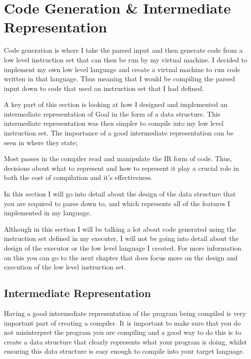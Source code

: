 
\chapter{Code Generation \& Intermediate Representation}

Code generation is where I take the parsed input and then generate code from a low level instruction set that can then be run by my virtual machine. I decided to implement my own low level language and create a virtual machine to run code written in that language. Thus meaning that I would be compiling the parsed input down to code that used an instruction set that I had defined.

A key part of this section is looking at how I designed and implemented an intermediate representation of Goal in the form of a data structure. This intermediate representation was then simpler to compile into my low level instruction set. The importance of a good intermediate representation can be seen in \cite[p.~221]{EngComp2012} where they state;

\begin{displayquote}
Most passes in the compiler read and manipulate the IR form of code. Thus, decisions about what to represent and how to represent it play a  crucial role in both the cost of compilation and it's effectiveness. 
\end{displayquote}

In this section I will go into detail about the design of the data structure that you are required to parse down to, and which represents all of the features I implemented in my language. 

Although in this section I will be talking a lot about code generated using the instruction set defined in my executer, I will not be going into detail about the design of the executor or the low level language I created. For more information on this you can go to the next chapter that does focus more on the design and execution of the low level instruction set.


\section{Intermediate Representation}

Having a good intermediate representation of the program being compiled is very important part of creating a compiler. It is important to make sure that you do not misinterpret the program you are compiling and a good way to do this is to create a data structure that clearly represents what your program is doing, whilst ensuring this data structure is easy enough to compile into your target language.

